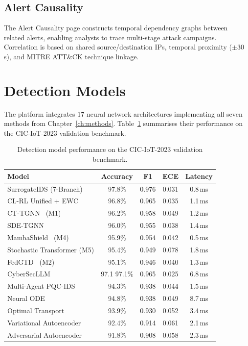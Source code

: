 \subsection{Alert Causality}

The Alert Causality page constructs temporal dependency graphs between related alerts, enabling analysts to trace multi-stage attack campaigns. Correlation is based on shared source/destination IPs, temporal proximity ($\pm$30\,s), and MITRE ATT\&CK technique linkage.


\section{Detection Models}
\label{sec:platform_models}

The platform integrates 17 neural network architectures implementing all seven methods from Chapter~\ref{ch:methods}. Table~\ref{tab:platform_models} summarises their performance on the CIC-IoT-2023 validation benchmark.

\begin{table}[htbp]
\centering
\caption{Detection model performance on the CIC-IoT-2023 validation benchmark.}
\label{tab:platform_models}
\small
\begin{tabular}{lcccc}
\toprule
\textbf{Model} & \textbf{Accuracy} & \textbf{F1} & \textbf{ECE} & \textbf{Latency} \\
\midrule
SurrogateIDS (7-Branch)   & 97.8\% & 0.976 & 0.031 & 0.8\,ms \\
CL-RL Unified + EWC      & 96.8\% & 0.965 & 0.035 & 1.1\,ms \\
CT-TGNN~\cite{Anaedevha2025cais} (M1)              & 96.2\% & 0.958 & 0.049 & 1.2\,ms \\
SDE-TGNN~\cite{Anaedevha2026sdetgnn}                  & 96.0\% & 0.955 & 0.038 & 1.4\,ms \\
MambaShield~\cite{Anaedevha2026mamba} (M4)          & 95.9\% & 0.954 & 0.042 & 0.5\,ms \\
Stochastic Transformer (M5) & 95.4\% & 0.949 & 0.078 & 1.8\,ms \\
FedGTD~\cite{Anaedevha2026neurips} (M2)               & 95.1\% & 0.946 & 0.040 & 1.3\,ms \\
CyberSecLLM~\cite{Anaedevha2026cybersecllm}               & 97.1 97.1\% & 0.965 & 0.025 & 6.8\,ms \\
Multi-Agent PQC-IDS       & 94.3\% & 0.938 & 0.044 & 1.5\,ms \\
Neural ODE                & 94.8\% & 0.938 & 0.049 & 8.7\,ms \\
Optimal Transport         & 93.9\% & 0.930 & 0.052 & 3.4\,ms \\
Variational Autoencoder   & 92.4\% & 0.914 & 0.061 & 2.1\,ms \\
Adversarial Autoencoder   & 91.8\% & 0.908 & 0.058 & 2.3\,ms \\
\bottomrule
\end{tabular}
\end{table}

